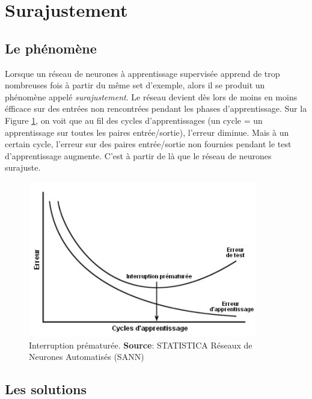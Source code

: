 \section{Surajustement}
\subsection{Le phénomène}
Lorsque un réseau de neurones à apprentissage supervisée apprend de trop nombreuses fois à partir du même set d'exemple, alors il se produit un phénomène appelé \emph{surajustement}.\cite{statistica}
Le réseau devient dès lors de moins en moins éfficace sur des entrées non rencontrées pendant les phases d'apprentissage.
Sur la Figure \ref{interruption}, on voit que au fil des cycles d'apprentissages (un cycle = un apprentissage sur toutes les paires entrée/sortie), l'erreur diminue.
Mais à un certain cycle, l'erreur sur des paires entrée/sortie non fournies pendant le test d'apprentissage augmente.
C'est à partir de là que le réseau de neurones surajuste.
\begin{figure}
 \centering
 \includegraphics[scale=0.6]{../figures/surgeneralisation.jpg}
 \caption{Interruption prématurée. \textbf{Source}: STATISTICA Réseaux de Neurones Automatisés (SANN)\cite{statistica}}
 \label{interruption}
\end{figure}
\subsection{Les solutions}
